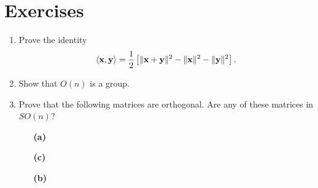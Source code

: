  
 
\section*{Exercises}
\exrule
 
 
{\small
\begin{enumerate}
 
 
 
\bf\item\rm
Prove the identity
\[
\langle {\bold x}, {\bold y} \rangle = \frac{1}{2}
\left[
\|{\bold x} + {\bold y}\|^2 - \|{\bold x}\|^2 - \| {\bold y}\|^2
\right].
\]
 
 
\bf\item\rm
Show that $O(n)$ is a group.
 
 
\bf\item\rm
Prove that the following matrices are orthogonal. Are any of
these matrices in $SO(n)$?
 
\vspace{3pt}        %
 
\hspace{-7pt}
\begin{minipage}[t]{4.6in}
\noindent
\begin{minipage}[t]{2.25in}
\begin{itemize}
 
 \item[{\bf (a)}]

 
 \item[{\bf (c)}]

\end{itemize}
\end{minipage} \hfill
\begin{minipage}[t]{2.25in}
\begin{itemize}
 
 \item[{\bf (b)}]
 

\end{itemize}
\end{minipage}
\end{minipage}
\end{enumerate}}
